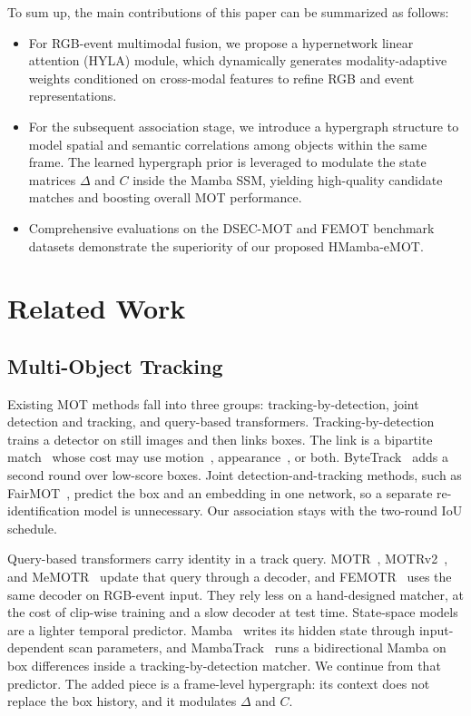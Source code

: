 \documentclass[10pt,twocolumn,letterpaper]{article}
\begin{document}
To sum up, the main contributions of this paper can be summarized as follows:
\begin{itemize}
\item For RGB-event multimodal fusion, we propose a hypernetwork linear attention (HYLA) module, which dynamically generates modality-adaptive weights conditioned on cross-modal features to refine RGB and event representations. 
\item For the subsequent association stage, we introduce a hypergraph structure to model spatial and semantic correlations among objects within the same frame. The learned hypergraph prior is leveraged to modulate the state matrices $\Delta$ and $C$ inside the Mamba SSM, yielding high-quality candidate matches and boosting overall MOT performance. 
\item Comprehensive evaluations on the DSEC-MOT and FEMOT benchmark datasets demonstrate the superiority of our proposed HMamba-eMOT.  
\end{itemize}




\section{Related Work}

\subsection{Multi-Object Tracking}

Existing MOT methods fall into three groups: tracking-by-detection, joint detection and tracking, and query-based transformers. Tracking-by-detection trains a detector on still images and then links boxes. The link is a bipartite match~\cite{jonker1987lap} whose cost may use motion~\cite{cao2023ocsort}, appearance~\cite{wojke2017deepsort}, or both. ByteTrack~\cite{zhang2022bytetrack} adds a second round over low-score boxes. Joint detection-and-tracking methods, such as FairMOT~\cite{zhang2021fairmot}, predict the box and an embedding in one network, so a separate re-identification model is unnecessary. Our association stays with the two-round IoU schedule.

Query-based transformers carry identity in a track query. MOTR~\cite{zeng2022motr}, MOTRv2~\cite{zhang2023motrv2}, and MeMOTR~\cite{gao2023memotr} update that query through a decoder, and FEMOTR~\cite{wang2026femot} uses the same decoder on RGB-event input. They rely less on a hand-designed matcher, at the cost of clip-wise training and a slow decoder at test time. State-space models are a lighter temporal predictor. Mamba~\cite{gu2023mamba} writes its hidden state through input-dependent scan parameters, and MambaTrack~\cite{huang2024mambatrack} runs a bidirectional Mamba on box differences inside a tracking-by-detection matcher. We continue from that predictor. The added piece is a frame-level hypergraph: its context does not replace the box history, and it modulates $\Delta$ and $C$.
\end{document}
